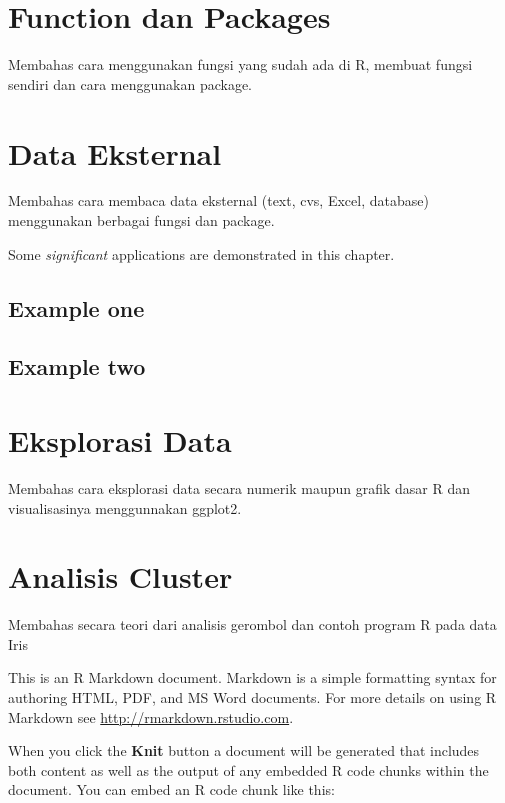 \documentclass[]{book}
\begin{document}
\hypertarget{functionandpackage}{%
\chapter{Function dan Packages}\label{functionandpackage}}

Membahas cara menggunakan fungsi yang sudah ada di R, membuat fungsi sendiri dan cara menggunakan package.

\hypertarget{externaldata}{%
\chapter{Data Eksternal}\label{externaldata}}

Membahas cara membaca data eksternal (text, cvs, Excel, database) menggunakan berbagai fungsi dan package.

Some \emph{significant} applications are demonstrated in this chapter.

\hypertarget{example-one}{%
\section{Example one}\label{example-one}}

\hypertarget{example-two}{%
\section{Example two}\label{example-two}}

\hypertarget{exploration}{%
\chapter{Eksplorasi Data}\label{exploration}}

Membahas cara eksplorasi data secara numerik maupun grafik dasar R dan visualisasinya menggunnakan ggplot2.

\hypertarget{clustering}{%
\chapter{Analisis Cluster}\label{clustering}}

Membahas secara teori dari analisis gerombol dan contoh program R pada data Iris

This is an R Markdown document. Markdown is a simple formatting syntax for authoring HTML, PDF, and MS Word documents. For more details on using R Markdown see \url{http://rmarkdown.rstudio.com}.

When you click the \textbf{Knit} button a document will be generated that includes both content as well as the output of any embedded R code chunks within the document. You can embed an R code chunk like this:
\end{document}
